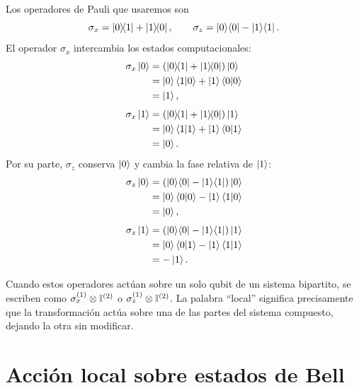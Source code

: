 \documentclass[../main.tex]{subfiles}
\begin{document}
Los operadores de Pauli que usaremos son
\begin{equation*}
    \sigma_x=\ketbra{0}{1}+\ketbra{1}{0},
    \qquad
    \sigma_z=\ket{0}\!\bra{0}-\ket{1}\!\bra{1}.
\end{equation*}
El operador $\sigma_x$ intercambia los estados computacionales:
\begin{align*}
    \sigma_x\ket{0}
    &=\left(\ketbra{0}{1}+\ketbra{1}{0}\right)\ket{0}\\
    &=\ket{0}\braket{1|0}+\ket{1}\braket{0|0}\\
    &=\ket{1},
\end{align*}
\begin{align*}
    \sigma_x\ket{1}
    &=\left(\ketbra{0}{1}+\ketbra{1}{0}\right)\ket{1}\\
    &=\ket{0}\braket{1|1}+\ket{1}\braket{0|1}\\
    &=\ket{0}.
\end{align*}
Por su parte, $\sigma_z$ conserva $\ket{0}$ y cambia la fase relativa de $\ket{1}$:
\begin{align*}
    \sigma_z\ket{0}
    &=\left(\ket{0}\!\bra{0}-\ket{1}\!\bra{1}\right)\ket{0}\\
    &=\ket{0}\braket{0|0}-\ket{1}\braket{1|0}\\
    &=\ket{0},
\end{align*}
\begin{align*}
    \sigma_z\ket{1}
    &=\left(\ket{0}\!\bra{0}-\ket{1}\!\bra{1}\right)\ket{1}\\
    &=\ket{0}\braket{0|1}-\ket{1}\braket{1|1}\\
    &=-\ket{1}.
\end{align*}

Cuando estos operadores actúan sobre un solo qubit de un sistema bipartito, se escriben como $\sigma_x^{(1)}\otimes\mathbb{I}^{(2)}$ o $\sigma_z^{(1)}\otimes\mathbb{I}^{(2)}$. La palabra ``local'' significa precisamente que la transformación actúa sobre una de las partes del sistema compuesto, dejando la otra sin modificar.

\section{Acción local sobre estados de Bell}
\end{document}
